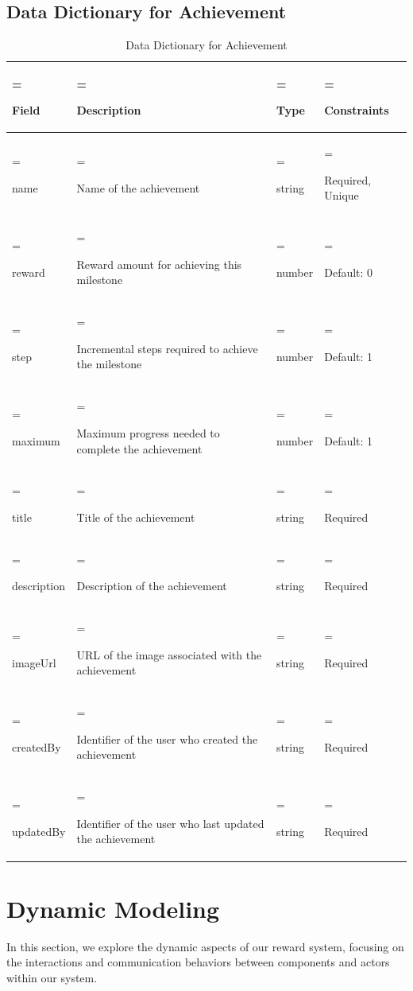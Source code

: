 \subsection{Data Dictionary for Achievement}
\begin{table}[H]
    \renewcommand{\arraystretch}{1.5} %
    \centering
    \caption{Data Dictionary for Achievement}
    \medskip
    \begin{tabularx}{\textwidth} {
            | >{\hsize=0.8\hsize\linewidth=\hsize\raggedright\arraybackslash}X
            | >{\hsize=1.5\hsize\linewidth=\hsize\raggedright\arraybackslash}X
            | >{\hsize=0.6\hsize\linewidth=\hsize\raggedright\arraybackslash}X
            | >{\hsize=1.1\hsize\linewidth=\hsize\raggedright\arraybackslash}X |}
        \hline
        \rowcolor{primary} \textbf{Field} & \textbf{Description} & \textbf{Type} & \textbf{Constraints} \\
        \hline
        name & Name of the achievement & string & Required, Unique \\
        \hline
        reward & Reward amount for achieving this milestone & number & Default: 0 \\
        \hline
        step & Incremental steps required to achieve the milestone & number & Default: 1 \\
        \hline
        maximum & Maximum progress needed to complete the achievement & number & Default: 1 \\
        \hline
        title & Title of the achievement & string & Required \\
        \hline
        description & Description of the achievement & string & Required \\
        \hline
        imageUrl & URL of the image associated with the achievement & string & Required \\
        \hline
        createdBy & Identifier of the user who created the achievement & string & Required \\
        \hline
        updatedBy & Identifier of the user who last updated the achievement & string & Required \\
        \hline
    \end{tabularx}
\end{table}
\section{Dynamic Modeling}
In this section, we explore the dynamic aspects of our reward system, focusing on the interactions and communication behaviors between components and actors within our system. 

